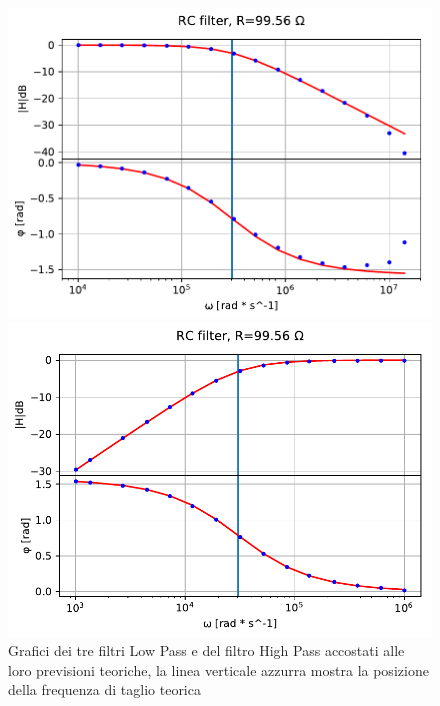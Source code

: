 \documentclass{article}
\begin{document}
\begin{figure}[h]
\begin{minipage}{0.5\textwidth}
        \includegraphics[width=\textwidth]{bodeplot3.pdf} 
    \end{minipage}\hfill
    \begin{minipage}{0.5\textwidth}
        \centering
        \includegraphics[width=\textwidth]{bodeplot4.pdf} 
    \end{minipage}
    \caption{Grafici dei tre filtri Low Pass e del filtro High Pass accostati alle loro previsioni teoriche, la linea verticale azzurra mostra la posizione della frequenza di taglio teorica}
    \label{fig:RC_fil}
\end{figure}
\end{document}

